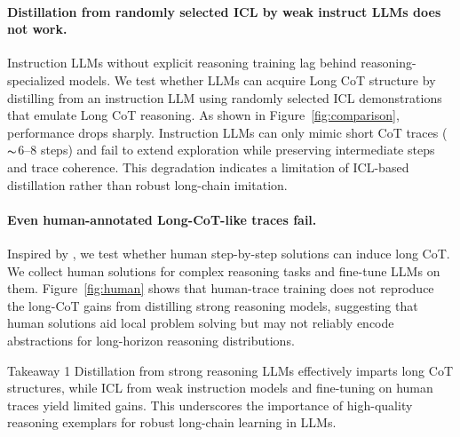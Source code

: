 \paragraph{\textbf{Distillation from randomly selected ICL by weak instruct LLMs does not work.}}
Instruction LLMs without explicit reasoning training lag behind reasoning-specialized models. We test whether LLMs can acquire Long CoT structure by distilling from an instruction LLM using randomly selected ICL demonstrations that emulate Long CoT reasoning. As shown in Figure~\ref{fig:comparison}, performance drops sharply. Instruction LLMs can only mimic short CoT traces ($\thicksim$6–8 steps) and fail to extend exploration while preserving intermediate steps and trace coherence. This degradation indicates a limitation of ICL-based distillation rather than robust long-chain imitation.\vspace{-8pt}


\paragraph{\textbf{Even human-annotated Long-CoT-like traces fail.}}
Inspired by \citet{du2025the}, we test whether human step-by-step solutions can induce long CoT. We collect human solutions for complex reasoning tasks and fine-tune LLMs on them. Figure~\ref{fig:human} shows that human-trace training does not reproduce the long-CoT gains from distilling strong reasoning models, suggesting that human solutions aid local problem solving but may not reliably encode abstractions for long-horizon reasoning distributions.

\begin{TakeawayBox}{Takeaway 1}
Distillation from strong reasoning LLMs effectively imparts long CoT structures, while ICL from weak instruction models and fine-tuning on human traces yield limited gains. This underscores the importance of high-quality reasoning exemplars for robust long-chain learning in LLMs.
\end{TakeawayBox}